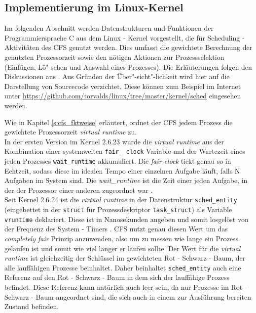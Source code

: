 \subsection{Implementierung im Linux-Kernel}\label{s:cstructs}
Im folgenden Abschnitt werden Datenstrukturen und Funktionen der Programmiersprache C aus dem Linux - Kernel vorgestellt, die für Scheduling - Aktivitäten des CFS genutzt werden. Dies umfasst die gewichtete Berechnung der genutzten Prozessorzeit sowie den nötigen Aktionen zur Prozessselektion (Einfügen, Lö"-schen und Auswahl eines Prozesses). Die Erläuterungen folgen den Diskussionen aus \cite{rlove}. Aus Gründen der Über"-sicht"-lichkeit wird hier auf die Darstellung von Sourcecode verzichtet. Diese können zum Beispiel im Internet unter \url{https://github.com/torvalds/linux/tree/master/kernel/sched} eingesehen werden.

Wie in Kapitel \ref{s:cfs_fktweise} erläutert, ordnet der CFS jedem Prozess die gewichtete Prozessorzeit \textit{virtual runtime} zu. \\
In der ersten Version im Kernel 2.6.23 wurde die \textit{virtual runtime} aus der Kombination einer systemweiten \texttt{fair\_ clock} Variable und der Wartezeit eines jeden Prozesses \texttt{wait\_runtime} akkumuliert. Die \textit{fair clock} tickt genau so in Echtzeit, sodass diese im idealen Tempo einer einzelnen Aufgabe läuft, falls N Aufgaben im System sind. Die \textit{wait\_runtime} ist die Zeit einer jeden Aufgabe, in der der Prozessor einer anderen zugeordnet war \cite{cpabla}.\\
Seit Kernel 2.6.24 ist die \textit{virtual runtime} in der Datenstruktur \texttt{sched\_entity} (eingebettet in der \texttt{struct} für Prozessdeskriptor \texttt{task\_struct}) als Variable \texttt{vruntime} deklariert. Diese ist in Nanosekunden angeben und somit losgelöst von der Frequenz des System - Timers \cite{rlove}. CFS nutzt genau diesen Wert um das \textit{completely fair} Prinzip anzuwenden, also um zu messen wie lange ein Prozess gelaufen ist und somit wie viel länger er laufen sollte.
Der Wert für die \textit{virtual runtime} ist gleichzeitig der Schlüssel im gewichteten Rot - Schwarz - Baum, der alle lauffähigen Prozesse beinhaltet. Daher beinhaltet \texttt{sched\_entity} auch eine Referenz auf den Rot - Schwarz - Baum in dem sich der lauffähige Prozess befindet. Diese Referenz kann natürlich auch leer sein, da nur Prozesse im Rot - Schwarz - Baum angeordnet sind, die sich auch in einem zur Ausführung bereiten Zustand befinden.

